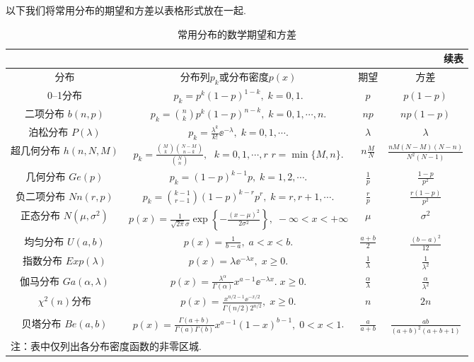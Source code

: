 以下我们将常用分布的期望和方差以表格形式放在一起.

\begin{longtable}{c|c|c|c}
  \caption{常用分布的数学期望和方差} \\
  \toprule
  \endfirsthead
  \multicolumn{4}{r}{续表}\\
  \hline
  \endhead
  \toprule
  分布 & 分布列$p_k$或分布密度$p(x)$ & 期望 & 方差 \\
  \midrule
  0--1分布 & $p_k=p^k(1-p)^{1-k},\;k=0,1.$ & $p$ & $p(1-p)$ \\
  \midrule
  \makecell{二项分布\\ $b(n,p)$} & $p_k=\binom nk p^k(1-p)^{n-k},\;k=0,1,\cdots,n.$ & $np$ & $np(1-p)$ \\
  \midrule
  \makecell{泊松分布 \\ $P(\lambda)$} & $p_k=\frac{\lambda^k}{k!}\ee^{-\lambda},\;k=0,1,\cdots.$
  & $\lambda$ & $\lambda$ \\
  \midrule
  \makecell{超几何分布 \\ $h(n,N,M)$} &
  $p_k=\frac{\binom Mk\binom{N-M}{n-k}}{\binom Nn},\;$ \makecell{$k=0,1,\cdots,r$\\$r=\min\{M,n\}$.} & $n\frac MN$ & $\frac{nM(N-M)(N-n)}{N^2(N-1)}$ \\
  \midrule
  \makecell{几何分布 \\ $Ge(p)$} & $p_k=(1-p)^{k-1}p,\;k=1,2,\cdots$. & $\frac1p$ & $\frac{1-p}{p^2}$ \\
  \midrule
  \makecell{负二项分布\\ $Nn(r,p)$} &
  $p_k=\binom{k-1}{r-1}(1-p)^{k-r}p^r,\;k=r,r+1,\cdots$.
  & $\frac rp$ & $\frac{r(1-p)}{p^2}$ \\
  \midrule
  \makecell{正态分布 \\ $N(\mu,\sigma^2)$} &
  $p(x)=\frac1{\sqrt{2\pi}\sigma}\exp\left\{
  -\frac{(x-\mu)^2}{2\sigma^2}\right\},\;-\infty<x<
  +\infty$ & $\mu$ & $\sigma^2$ \\
  \midrule
  \makecell{均匀分布 \\ $U(a,b)$} & $p(x)=\frac1{b-a},\;a<x<b$. & $\frac{a+b}2$ &
  $\frac{(b-a)^2}{12}$ \\
  \midrule
  \makecell{指数分布 \\ $Exp(\lambda)$} & $p(x)=\lambda\ee^{-\lambda x},\;x\ge0$. & $\frac1{\lambda}$ & $\frac1{\lambda^2}$ \\
  \midrule
  \makecell{伽马分布 \\ $Ga(\alpha,\lambda)$} &
  $p(x)=\frac{\lambda^\alpha}{\Gamma(\alpha)}
  x^{a-1}\ee^{-\lambda x}.\; x\ge0$. & $\frac\alpha\lambda$ & $\frac\alpha{\lambda^2}$ \\
  \midrule
  $\chi^2(n)$分布 & $p(x)=\frac{x^{n/2-1}\ee^{-x/2}}{\Gamma(n/2)2^{n/2}},\;
  x\ge0$. & $n$ & $2n$ \\
  \midrule
  \makecell{贝塔分布 \\ $Be(a,b)$} &
  $p(x)=\frac{\Gamma(a+b)}{\Gamma(a)\Gamma(b)}
  x^{a-1}(1-x)^{b-1},\;0<x<1$. & $\frac a{a+b}$ &
  $\frac{ab}{(a+b)^2(a+b+1)}$ \\
  \bottomrule
  \multicolumn{4}{l}{注：表中仅列出各分布密度函数的非零区城.}
\end{longtable}

